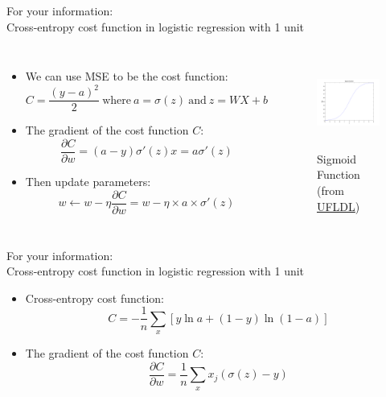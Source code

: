 \documentclass[10pt]{beamer}
\begin{document}
	\begin{frame}{For your information: \\ Cross-entropy cost function in logistic regression with 1 unit}
		\begin{columns}
			\begin{itemize}
				\item We can use MSE to be the cost function:
				$$C=\frac{(y-a)^2}{2} ~\text{where}~ a=\sigma(z) ~\text{and}~ z=WX+b$$
				\item The gradient of the cost function $C$:
				$$\frac{\partial C}{\partial w}=(a-y)\sigma'(z)x=a\sigma'(z)$$
				\item Then update parameters:
				$$w\leftarrow w-\eta\frac{\partial C}{\partial w}=w-\eta\times a\times \sigma'(z)$$
			\end{itemize}
			\begin{figure}
				\includegraphics[height=8em]{figures/sigmoid.png}
				\caption{Sigmoid Function (from \href{http://ufldl.stanford.edu/wiki/index.php/File:Sigmoid_Function.png}{UFLDL})}
			\end{figure}
		\end{columns}
	\end{frame}

	\begin{frame}{For your information: \\ Cross-entropy cost function in logistic regression with 1 unit}
		\begin{itemize}
			\item Cross-entropy cost function:
			$$C=-\frac{1}{n}\sum_x\left[y\ln a+(1-y)\ln (1-a)\right]$$
			\item The gradient of the cost function $C$:
			$$\frac{\partial C}{\partial w}=\frac{1}{n}\sum_xx_j(\sigma(z)-y)$$
		\end{itemize}
	\end{frame}
\end{document}
